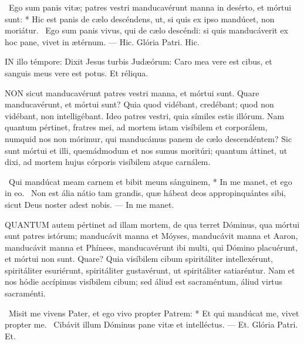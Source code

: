 \R\ Ego sum panis vitæ; patres vestri manducavérunt manna in desérto, et mórtui sunt: * Hic est panis de cælo descéndens, ut, si quis ex ipso mandúcet, non moriátur. \V\ Ego sum panis vivus, qui de cælo descéndi: si quis manducáverit ex hoc pane, vivet in ætérnum. --- Hic. Glória Patri. Hic.




\lettrine[lines=2]{I}{N} illo témpore: Dixit Jesus turbis Judæórum: Caro mea vere est cibus, et sanguis meus vere est potus. Et réliqua.



\lettrine[lines=2]{N}{ON} sicut manducavérunt patres vestri manna, et mórtui sunt. Quare manducavérunt, et mórtui sunt? Quia quod vidébant, credébant; quod non vidébant, non intelligébant. Ideo patres vestri, quia símiles estis illórum. Nam quantum pértinet, fratres mei, ad mortem istam visíbilem et corporálem, numquid nos non mórimur, qui manducámus panem de cælo descendéntem? Sic sunt mórtui et illi, quemádmodum et nos sumus moritúri; quantum áttinet, ut dixi, ad mortem hujus córporis visíbilem atque carnálem.

\R\ Qui mandúcat meam carnem et bibit meum sánguinem, * In me manet, et ego in eo. \V\ Non est ália nátio tam grandis, quæ hábeat deos appropinquántes sibi, sicut Deus noster adest nobis. --- In me manet.


\lettrine[lines=2]{Q}{UANTUM} autem pértinet ad illam mortem, de qua terret Dóminus, qua mórtui sunt patres istórum; manducávit manna et Móyses, manducávit manna et Aaron, manducávit manna et Phínees, manducavérunt ibi multi, qui Dómino placuérunt, et mórtui non sunt. Quare? Quia visíbilem cibum spiritáliter intellexérunt, spiritáliter esuriérunt, spiritáliter gustavérunt, ut spiritáliter satiaréntur. Nam et nos hódie accípimus visíbilem cibum; sed áliud est sacraméntum, áliud virtus sacraménti.

\R\ Misit me vivens Pater, et ego vivo propter Patrem: * Et qui mandúcat me, vivet propter me. \V\ Cibávit illum Dóminus pane vitæ et intelléctus. --- Et. Glória Patri. Et.


